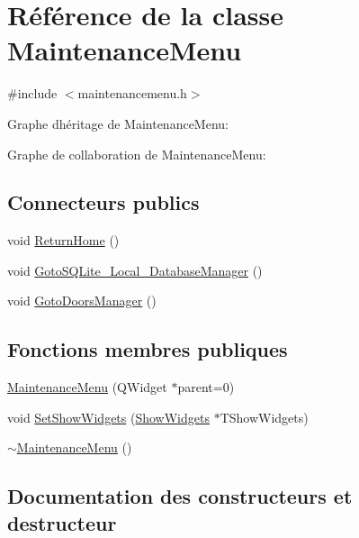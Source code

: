 \hypertarget{class_maintenance_menu}{}\section{Référence de la classe Maintenance\+Menu}
\label{class_maintenance_menu}


{\ttfamily \#include $<$maintenancemenu.\+h$>$}



Graphe d\textquotesingle{}héritage de Maintenance\+Menu\+:


Graphe de collaboration de Maintenance\+Menu\+:
\subsection*{Connecteurs publics}
\begin{DoxyCompactItemize}
\item 
void \hyperlink{class_maintenance_menu_a24fea77d8fd45cf1298a8e26e177a862}{Return\+Home} ()
\item 
void \hyperlink{class_maintenance_menu_a510658e4647fb3104e425df6f5457351}{Goto\+S\+Q\+Lite\+\_\+\+Local\+\_\+\+Database\+Manager} ()
\item 
void \hyperlink{class_maintenance_menu_af163afae9ddb54847fd7a9ec2e1b2398}{Goto\+Doors\+Manager} ()
\end{DoxyCompactItemize}
\subsection*{Fonctions membres publiques}
\begin{DoxyCompactItemize}
\item 
\hyperlink{class_maintenance_menu_aa14d840e72a986018d25e7a3ba14cbab}{Maintenance\+Menu} (Q\+Widget $\ast$parent=0)
\item 
void \hyperlink{class_maintenance_menu_a6d1631ca77745b2988ba808d5e8f86ad}{Set\+Show\+Widgets} (\hyperlink{class_show_widgets}{Show\+Widgets} $\ast$T\+Show\+Widgets)
\item 
\hyperlink{class_maintenance_menu_a429ef2908f41b9ee8a73165ebf3a6389}{$\sim$\+Maintenance\+Menu} ()
\end{DoxyCompactItemize}


\subsection{Documentation des constructeurs et destructeur}
\hypertarget{class_maintenance_menu_aa14d840e72a986018d25e7a3ba14cbab}{}
